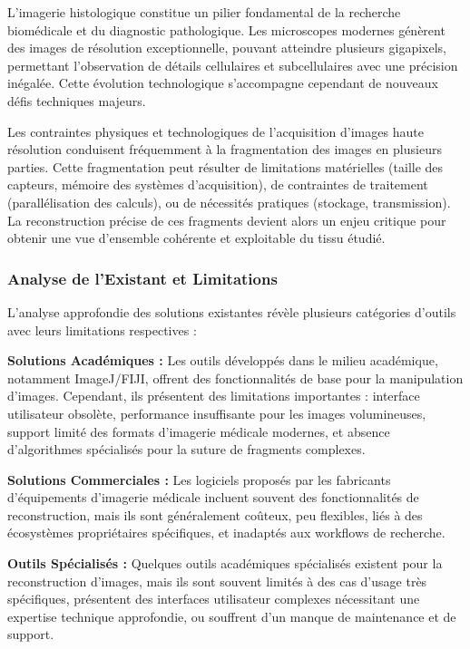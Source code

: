 \documentclass[12pt,a4paper]{article}
\begin{document}
L'imagerie histologique constitue un pilier fondamental de la recherche biomédicale et du diagnostic pathologique. Les microscopes modernes génèrent des images de résolution exceptionnelle, pouvant atteindre plusieurs gigapixels, permettant l'observation de détails cellulaires et subcellulaires avec une précision inégalée. Cette évolution technologique s'accompagne cependant de nouveaux défis techniques majeurs.

Les contraintes physiques et technologiques de l'acquisition d'images haute résolution conduisent fréquemment à la fragmentation des images en plusieurs parties. Cette fragmentation peut résulter de limitations matérielles (taille des capteurs, mémoire des systèmes d'acquisition), de contraintes de traitement (parallélisation des calculs), ou de nécessités pratiques (stockage, transmission). La reconstruction précise de ces fragments devient alors un enjeu critique pour obtenir une vue d'ensemble cohérente et exploitable du tissu étudié.

\subsubsection{Analyse de l'Existant et Limitations}

L'analyse approfondie des solutions existantes révèle plusieurs catégories d'outils avec leurs limitations respectives :

\textbf{Solutions Académiques :} Les outils développés dans le milieu académique, notamment ImageJ/FIJI, offrent des fonctionnalités de base pour la manipulation d'images. Cependant, ils présentent des limitations importantes : interface utilisateur obsolète, performance insuffisante pour les images volumineuses, support limité des formats d'imagerie médicale modernes, et absence d'algorithmes spécialisés pour la suture de fragments complexes.

\textbf{Solutions Commerciales :} Les logiciels proposés par les fabricants d'équipements d'imagerie médicale incluent souvent des fonctionnalités de reconstruction, mais ils sont généralement coûteux, peu flexibles, liés à des écosystèmes propriétaires spécifiques, et inadaptés aux workflows de recherche.

\textbf{Outils Spécialisés :} Quelques outils académiques spécialisés existent pour la reconstruction d'images, mais ils sont souvent limités à des cas d'usage très spécifiques, présentent des interfaces utilisateur complexes nécessitant une expertise technique approfondie, ou souffrent d'un manque de maintenance et de support.
\end{document}
